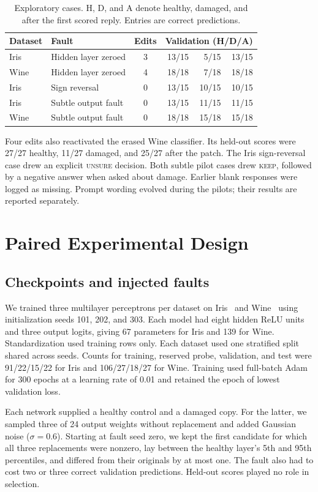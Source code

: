 \documentclass[conference,letterpaper]{IEEEtran}
\begin{document}
\begin{table}[!t]
\caption{Exploratory cases. H, D, and A denote healthy, damaged, and after the first scored reply. Entries are correct predictions.}\label{tab:pilot}
\centering\footnotesize\setlength{\tabcolsep}{3.5pt}
\begin{tabular}{@{}llcrrr@{}}\toprule
Dataset & Fault & Edits & \multicolumn{3}{c}{Validation (H/D/A)}\\\midrule
Iris & Hidden layer zeroed & 3 & 13/15 & 5/15 & 13/15\\
Wine & Hidden layer zeroed & 4 & 18/18 & 7/18 & 18/18\\
Iris & Sign reversal & 0 & 13/15 & 10/15 & 10/15\\
Iris & Subtle output fault & 0 & 13/15 & 11/15 & 11/15\\
Wine & Subtle output fault & 0 & 18/18 & 15/18 & 15/18\\\bottomrule
\end{tabular}
\end{table}
Four edits also reactivated the erased Wine classifier. Its held-out scores were 27/27 healthy, 11/27 damaged, and 25/27 after the patch. The Iris sign-reversal case drew an explicit \textsc{unsure} decision. Both subtle pilot cases drew \textsc{keep}, followed by a negative answer when asked about damage. Earlier blank responses were logged as missing. Prompt wording evolved during the pilots; their results are reported separately.

\section{Paired Experimental Design}
\subsection{Checkpoints and injected faults}
We trained three multilayer perceptrons per dataset on Iris~\cite{iris} and Wine~\cite{wine} using initialization seeds 101, 202, and 303. Each model had eight hidden ReLU units and three output logits, giving 67 parameters for Iris and 139 for Wine. Standardization used training rows only. Each dataset used one stratified split shared across seeds. Counts for training, reserved probe, validation, and test were 91/22/15/22 for Iris and 106/27/18/27 for Wine. Training used full-batch Adam for 300 epochs at a learning rate of 0.01 and retained the epoch of lowest validation loss.

Each network supplied a healthy control and a damaged copy. For the latter, we sampled three of 24 output weights without replacement and added Gaussian noise ($\sigma=0.6$). Starting at fault seed zero, we kept the first candidate for which all three replacements were nonzero, lay between the healthy layer's 5th and 95th percentiles, and differed from their originals by at most one. The fault also had to cost two or three correct validation predictions. Held-out scores played no role in selection.
\end{document}
